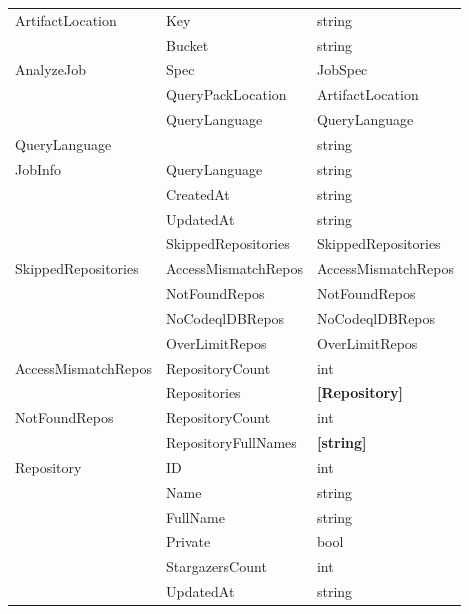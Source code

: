 \documentclass[11pt]{article}
\begin{document}
\begin{longtable}{|p{5cm}|p{5cm}|p{5cm}|}
  \hline
  ArtifactLocation & Key & string \\
                                        & Bucket & string \\

  \hline
  AnalyzeJob & Spec & JobSpec \\
                                        & QueryPackLocation & ArtifactLocation \\
                                        & QueryLanguage & QueryLanguage \\

  \hline
  QueryLanguage &  & string \\

  \hline
  JobInfo & QueryLanguage & string \\
                                        & CreatedAt & string \\
                                        & UpdatedAt & string \\
                                        & SkippedRepositories & SkippedRepositories \\

  \hline
  SkippedRepositories & AccessMismatchRepos & AccessMismatchRepos \\
                                        & NotFoundRepos & NotFoundRepos \\
                                        & NoCodeqlDBRepos & NoCodeqlDBRepos \\
                                        & OverLimitRepos & OverLimitRepos \\

  \hline
  AccessMismatchRepos & RepositoryCount & int \\
                                        & Repositories & \textbf{[Repository]} \\

  \hline
  NotFoundRepos & RepositoryCount & int \\
                                        & RepositoryFullNames & \textbf{[string]} \\

  \hline
  Repository & ID & int \\
                                        & Name & string \\
                                        & FullName & string \\
                                        & Private & bool \\
                                        & StargazersCount & int \\
                                        & UpdatedAt & string \\

\end{longtable}
\end{document}
